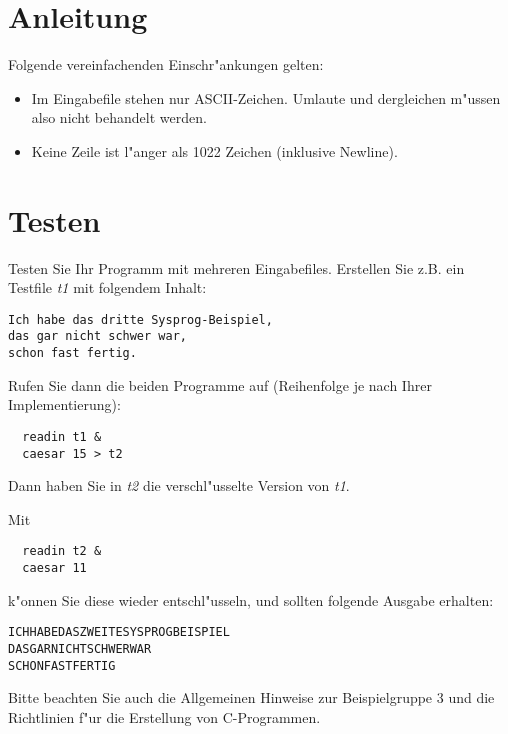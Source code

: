 \documentclass{article}
\begin{document}
\section*{Anleitung}
Folgende vereinfachenden Einschr"ankungen gelten:
\begin{itemize}
\item Im Eingabefile stehen nur ASCII-Zeichen. Umlaute und dergleichen
m"ussen also nicht behandelt werden.
\item Keine Zeile ist l"anger als 1022 Zeichen (inklusive Newline).
\end{itemize}




\section*{Testen}
Testen Sie Ihr Programm mit mehreren Eingabefiles. 
Erstellen Sie z.B. ein Testfile \emph{t1} mit folgendem Inhalt: 
\begin{verbatim}
Ich habe das dritte Sysprog-Beispiel,
das gar nicht schwer war,
schon fast fertig.
\end{verbatim}
Rufen Sie dann die beiden Programme auf (Reihenfolge je nach Ihrer
Implementierung):
\begin{verbatim}
  readin t1 &
  caesar 15 > t2
\end{verbatim}
Dann haben Sie in \emph{t2} die verschl"usselte Version von \emph{t1}.

\pagebreak
Mit
\begin{verbatim}
  readin t2 &
  caesar 11
\end{verbatim}
k"onnen Sie diese wieder entschl"usseln, und sollten folgende Ausgabe
erhalten:
\begin{verbatim}
ICHHABEDASZWEITESYSPROGBEISPIEL
DASGARNICHTSCHWERWAR
SCHONFASTFERTIG
\end{verbatim}

Bitte beachten Sie auch die Allgemeinen Hinweise zur Beispielgruppe 3
und die Richtlinien f"ur die Erstellung von C-Programmen.
\end{document}
